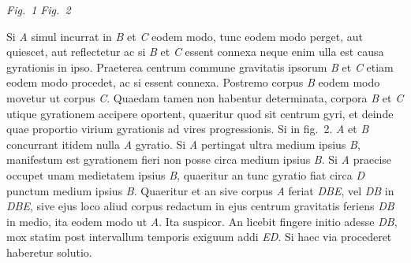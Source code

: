 \vspace{0.5em}
\centerline{%
\hfill
\lbrack\textit{Fig.~1%
}\rbrack %
\hspace*{45mm}
\lbrack\textit{Fig.~2%
}\rbrack
\hfill%
}
\vspace{1.5em}
%
\pstart\noindent
%
Si \textit{A} simul incurrat in \textit{B} et \textit{C} eodem modo, tunc eodem modo perget, aut quiescet, aut reflectetur
%
ac si \textit{B} et \textit{C} essent connexa neque enim ulla est causa gyrationis%
\protect{} in ipso.
%
Praeterea centrum commune gravitatis%
\protect{} ipsorum \textit{B} et \textit{C} etiam eodem modo procedet, ac si essent connexa. 
%
Postremo corpus \textit{B} eodem modo movetur ut corpus \textit{C}. Quaedam tamen non habentur determinata, 
%
%
%
%
corpora \textit{B} et \textit{C} utique gyrationem%
\protect{} accipere oportent, quaeritur quod sit centrum gyri,%
\protect{}\protect{} et deinde 
%
quae proportio virium gyrationis%
\protect{}%
\protect{} ad vires progressionis.%
\protect{}%
\protect{} 
\pend 
%
\pstart
Si in fig.~2. \textit{A} et \textit{B} concurrant itidem nulla
%
%
\textit{A} gyratio.%
\protect{} 
%
Si \textit{A} pertingat ultra
%
%
medium ipsius \textit{B}, manifestum est gyrationem\protect{} fieri non posse circa medium ipsius \textit{B}. 
%
Si \textit{A} praecise occupet 
unam medietatem ipsius \textit{B}, quaeritur an tunc %
gyratio\protect{} fiat circa \textit{D} 
%
punctum medium%
\protect{} ipsius \textit{B}. Quaeritur et an 
%
%
sive corpus \textit{A} feriat \textit{DBE}, vel \textit{DB} in \textit{DBE}, sive ejus loco aliud corpus redactum  
%
in ejus %
centrum gravitatis\protect{} feriens \textit{DB} in medio, ita eodem modo ut \textit{A}. Ita suspicor. 
\pend 
%
\pstart
An licebit fingere initio adesse \textit{DB}, mox statim post intervallum temporis exiguum
%
addi \textit{ED}. Si haec via procederet haberetur solutio. 
\pend 
\count{}%
\count{}%
\count{}